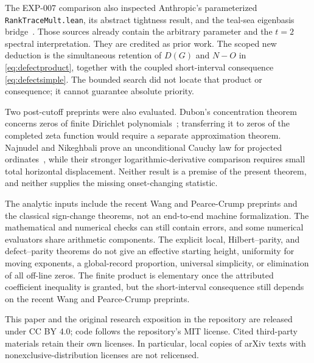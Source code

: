﻿\documentclass[11pt]{article}
\theoremstyle{remark}
\begin{document}
The EXP-007 comparison also inspected Anthropic's parameterized
\texttt{RankTraceMult.lean}, its abstract tightness result, and the teal-sea
eigenbasis bridge~\cite{AnthropicFormal,TealSea}. Those sources already contain
the arbitrary parameter and the $t=2$ spectral interpretation. They are
credited as prior work. The scoped new deduction is the simultaneous retention
of $D(G)$ and $N-O$ in \eqref{eq:defectproduct}, together with the coupled
short-interval consequence \eqref{eq:defectsimple}. The bounded search did not
locate that product or consequence; it cannot guarantee absolute priority.

Two post-cutoff preprints were also evaluated. Dubon's concentration theorem
concerns zeros of finite Dirichlet polynomials~\cite{Dubon}; transferring it to
zeros of the completed zeta function would require a separate approximation
theorem. Najnudel and Nikeghbali prove an unconditional Cauchy law for projected
ordinates~\cite{NajnudelNikeghbali}, while their stronger logarithmic-derivative
comparison requires small total horizontal displacement. Neither result is a
premise of the present theorem, and neither supplies the missing onset-changing
statistic.

The analytic inputs include the recent Wang and Pearce-Crump preprints and
the classical sign-change theorems, not an end-to-end machine formalization.
The mathematical and numerical checks can still contain errors, and some
numerical evaluators share arithmetic components. The explicit local,
Hilbert--parity, and defect--parity theorems
do not give an effective starting height, uniformity for moving exponents,
a global-record proportion, universal simplicity, or elimination of all
off-line zeros. The finite product is elementary once the attributed
coefficient inequality is granted, but the short-interval consequence still
depends on the recent Wang and Pearce-Crump preprints.

This paper and the original research exposition in the repository are
released under CC BY 4.0; code follows the repository's MIT license.
Cited third-party materials retain their own licenses. In particular,
local copies of arXiv texts with nonexclusive-distribution licenses are
not relicensed.
\end{document}
